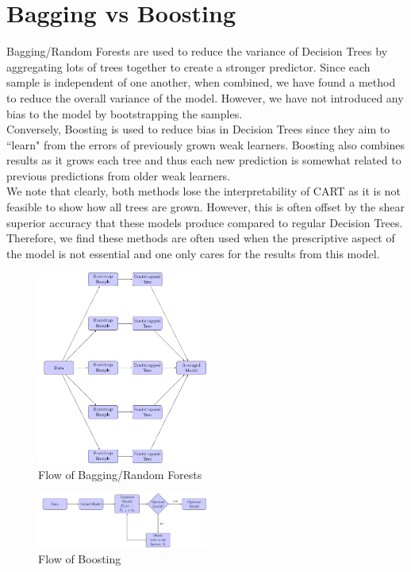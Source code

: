 \documentclass[11pt,a4paper]{report}
\begin{document}
\section{Bagging vs Boosting}
Bagging/Random Forests are used to reduce the variance of Decision Trees by aggregating lots of trees together to create a stronger predictor.
Since each sample is independent of one another, when combined, we have found a method to reduce the overall variance of the model. 
However, we have not introduced any bias to the model by bootstrapping the samples.
\medskip\\
Conversely, Boosting is used to reduce bias in Decision Trees since they aim to ``learn" from the errors of previously grown weak learners.
Boosting also combines results as it grows each tree and thus each new prediction is somewhat related to previous predictions from older weak learners.
\bigskip\\
We note that clearly, both methods lose the interpretability of CART as it is not feasible to show how all trees are grown.
However, this is often offset by the shear superior accuracy that these models produce compared to regular Decision Trees.
Therefore, we find these methods are often used when the prescriptive aspect of the model is not essential and one only cares for the results from this model.
\begin{figure}
    \centering
    \includegraphics[width=0.5\textwidth]{reportcharts/boostrapflow.pdf}
    \caption{Flow of Bagging/Random Forests}
    \label{fig:boostrapflow}
\end{figure}
\begin{figure}
    \centering
    \includegraphics[width=0.5\textwidth]{reportcharts/boostingflow.pdf}
    \caption{Flow of Boosting}
    \label{fig:boostingflow}
\end{figure}
\end{document}
